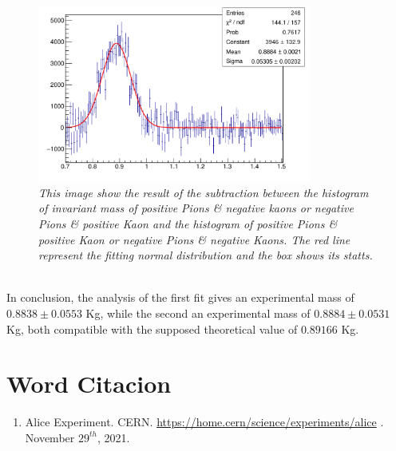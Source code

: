 \documentclass[a4paper, 11pt]{article}
\begin{document}
    \begin{figure}[h!]
      \includegraphics[width=9cm]{c5.pdf}
      \caption{\label{f6} \textit{This image show the result of the subtraction between the histogram of invariant mass of positive Pions \& negative kaons or negative Pions \& positive Kaon and the histogram of positive Pions \& positive Kaon or negative Pions \& negative Kaons. The red line represent the fitting normal distribution and the box shows its statts.}}
    \end{figure}
    \\
    In conclusion, the analysis of the first fit gives an experimental mass of $0.8838 \pm 0.0553$ Kg, while the second an experimental mass of $0.8884 \pm 0.0531$ Kg, both compatible with the supposed theoretical value of $0.89166$ Kg.
    \section* {Word Citacion}
    \begin{enumerate}
      \item{Alice Experiment. CERN. \url{https://home.cern/science/experiments/alice} . November $29^{th}$, 2021.}
    \end{enumerate}
\end{document}
